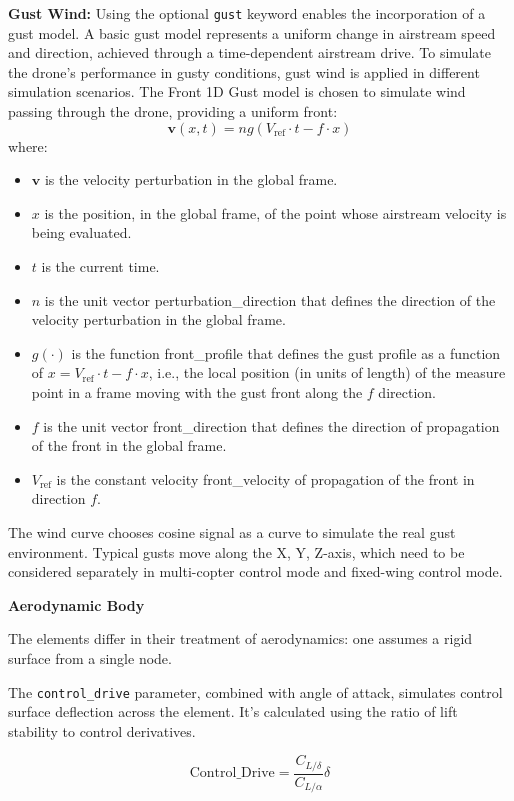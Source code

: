 \textbf{Gust Wind:} Using the optional \texttt{gust} keyword enables the incorporation of a gust model. A basic gust model represents a uniform change in airstream speed and direction, achieved through a time-dependent airstream drive. To simulate the drone's performance in gusty conditions, gust wind is applied in different simulation scenarios. The Front 1D Gust model is chosen to simulate wind passing through the drone, providing a uniform front:
\[
\mathbf{v}(x, t) = n g(V_{\text{ref}} \cdot t - f \cdot x)
\]
where:
\begin{itemize}
    \item $\mathbf{v}$ is the velocity perturbation in the global frame.
    \item $x$ is the position, in the global frame, of the point whose airstream velocity is being evaluated.
    \item $t$ is the current time.
    \item $n$ is the unit vector perturbation\_direction that defines the direction of the velocity perturbation in the global frame.
    \item $g(\cdot)$ is the function front\_profile that defines the gust profile as a function of $x = V_{\text{ref}} \cdot t - f \cdot x$, i.e., the local position (in units of length) of the measure point in a frame moving with the gust front along the $f$ direction.
    \item $f$ is the unit vector front\_direction that defines the direction of propagation of the front in the global frame.
    \item $V_{\text{ref}}$ is the constant velocity front\_velocity of propagation of the front in direction $f$.
\end{itemize}

The wind curve chooses cosine signal as a curve to simulate the real gust environment. Typical gusts move along the X, Y, Z-axis, which need to be considered separately in multi-copter control mode and fixed-wing control mode.

\textbf{Aerodynamic Body}

The elements differ in their treatment of aerodynamics: one assumes a rigid surface from a single node.

The \texttt{control\_drive} parameter, combined with angle of attack, simulates control surface deflection across the element. It's calculated using the ratio of lift stability to control derivatives.

\begin{equation}
    \text{Control\_Drive} = \frac{C_{L/\delta}} {C_{L/\alpha}} \delta
\end{equation}

